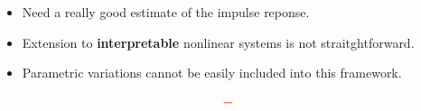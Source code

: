 \documentclass[aspectratio=169, usenames, dvipsnames]{beamer}
\begin{document}
\begin{frame}
  \vfill

  \begin{minipage}{.68\textwidth}
    \begin{itemize}
      \item Need a really good estimate of the impulse reponse.

      \bigskip

      \item Extension to \textbf{interpretable} nonlinear systems is not straitghtforward.

      \bigskip

      \item Parametric variations cannot be easily included into this framework.

    \end{itemize}
  \end{minipage}%
  \hfill
  \begin{minipage}{.28\textwidth}
    \centering
    \Huge
    \[
    \color{red} \bm{-}
    \]
  \end{minipage}

  \vfill
\end{frame}
\end{document}
